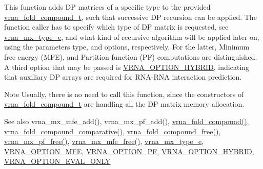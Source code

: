 This function adds DP matrices of a specific type to the provided \hyperlink{group__fold__compound_ga1b0cef17fd40466cef5968eaeeff6166}{vrna\+\_\+fold\+\_\+compound\+\_\+t}, such that successive DP recursion can be applied. The function caller has to specify which type of DP matrix is requested, see \hyperlink{group__dp__matrices_ga6042ea1d58d01931e959791be6d89343}{vrna\+\_\+mx\+\_\+type\+\_\+e}, and what kind of recursive algorithm will be applied later on, using the parameters type, and options, respectively. For the latter, Minimum free energy (M\+FE), and Partition function (PF) computations are distinguished. A third option that may be passed is \hyperlink{group__fold__compound_ga8f681fa12b8d4b348bf58415fd1fc82f}{V\+R\+N\+A\+\_\+\+O\+P\+T\+I\+O\+N\+\_\+\+H\+Y\+B\+R\+ID}, indicating that auxiliary DP arrays are required for R\+N\+A-\/\+R\+NA interaction prediction.

\begin{DoxyNote}{Note}
Usually, there is no need to call this function, since the constructors of \hyperlink{group__fold__compound_ga1b0cef17fd40466cef5968eaeeff6166}{vrna\+\_\+fold\+\_\+compound\+\_\+t} are handling all the DP matrix memory allocation.
\end{DoxyNote}
\begin{DoxySeeAlso}{See also}
vrna\+\_\+mx\+\_\+mfe\+\_\+add(), vrna\+\_\+mx\+\_\+pf\+\_\+add(), \hyperlink{group__fold__compound_ga6601d994ba32b11511b36f68b08403be}{vrna\+\_\+fold\+\_\+compound()}, \hyperlink{group__fold__compound_gad6bacc816af274922b13d947f708aa0c}{vrna\+\_\+fold\+\_\+compound\+\_\+comparative()}, \hyperlink{group__fold__compound_gadded6039d63f5d6509836e20321534ad}{vrna\+\_\+fold\+\_\+compound\+\_\+free()}, \hyperlink{group__dp__matrices_ga2283e69fd139fb8e58d7ade3b5773f9c}{vrna\+\_\+mx\+\_\+pf\+\_\+free()}, \hyperlink{group__dp__matrices_ga6a9422feb5dfe5c64050cebf447672d0}{vrna\+\_\+mx\+\_\+mfe\+\_\+free()}, \hyperlink{group__dp__matrices_ga6042ea1d58d01931e959791be6d89343}{vrna\+\_\+mx\+\_\+type\+\_\+e}, \hyperlink{group__fold__compound_gae63be9127fe7dcc1f9bb14f5bb1064ee}{V\+R\+N\+A\+\_\+\+O\+P\+T\+I\+O\+N\+\_\+\+M\+FE}, \hyperlink{group__fold__compound_gabfbadcddda3e74ce7f49035ef8f058f7}{V\+R\+N\+A\+\_\+\+O\+P\+T\+I\+O\+N\+\_\+\+PF}, \hyperlink{group__fold__compound_ga8f681fa12b8d4b348bf58415fd1fc82f}{V\+R\+N\+A\+\_\+\+O\+P\+T\+I\+O\+N\+\_\+\+H\+Y\+B\+R\+ID}, \hyperlink{group__fold__compound_ga61469c423131552c8483229f8b6c7e0e}{V\+R\+N\+A\+\_\+\+O\+P\+T\+I\+O\+N\+\_\+\+E\+V\+A\+L\+\_\+\+O\+N\+LY}
\end{DoxySeeAlso}

